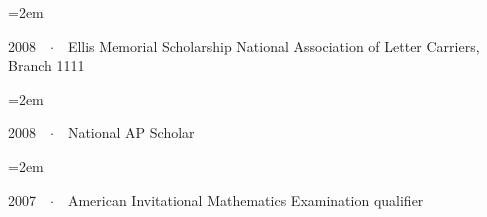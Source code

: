 \documentclass[a4paper]{scrartcl}
\newcommand{\Description}[1]{\hangindent=2em\hangafter=0\noindent\raggedright\footnotesize{#1}\par\normalsize\vspace{1em}} %
\begin{document}
\begin{cv}{}
\vspace{-0.5em} %

\Description{2008\ \ $\cdotp$\ \ Ellis Memorial Scholarship\newline\hphantom{2008\ \ $\cdotp$\ } National Association of Letter Carriers, Branch 1111}

\vspace{-0.5em} %

\Description{2008\ \ $\cdotp$\ \ National AP Scholar}

\vspace{-0.5em} %

\Description{2007\ \ $\cdotp$\ \ American Invitational Mathematics Examination qualifier}


\end{cv}
\end{document}
